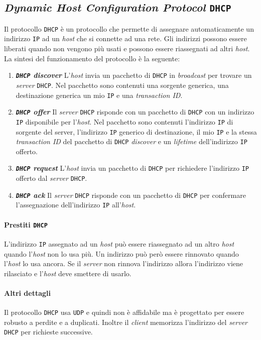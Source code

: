    \subsection{\textit{Dynamic Host Configuration Protocol} \texttt{DHCP}}
        Il protocollo \texttt{DHCP} è un protocollo che permette di assegnare automaticamente un indirizzo \texttt{IP} ad un \textit{host} che si connette ad una rete. Gli indirizzi possono essere liberati quando non vengono più usati e possono essere riassegnati ad altri \textit{host}. La sintesi del funzionamento del protocollo è la seguente: \begin{enumerate}
            \item \textit\textbf{\texttt{DHCP} discover} L'\textit{host} invia un pacchetto di \texttt{DHCP} in \textit{broadcast} per trovare un \textit{server} \texttt{DHCP}. Nel pacchetto sono contenuti una sorgente generica, una destinazione generica un mio \texttt{IP} e una \textit{transaction ID}.
            \item \textit\textbf{\texttt{DHCP} offer} Il \textit{server} \texttt{DHCP} risponde con un pacchetto di \texttt{DHCP} con un indirizzo \texttt{IP} disponibile per l'\textit{host}. Nel pacchetto sono contenuti l'indirizzo \texttt{IP} di sorgente del server, l'indirizzo \texttt{IP} generico di destinazione, il mio \texttt{IP} e la stessa \textit{transaction ID} del pacchetto di \texttt{DHCP} \textit{discover} e un \textit{lifetime} dell'indirizzo \texttt{IP} offerto.
            \item \textit\textbf{\texttt{DHCP} request} L'\textit{host} invia un pacchetto di \texttt{DHCP} per richiedere l'indirizzo \texttt{IP} offerto dal \textit{server} \texttt{DHCP}. 
            \item \textit\textbf{\texttt{DHCP} ack} Il \textit{server} \texttt{DHCP} risponde con un pacchetto di \texttt{DHCP} per confermare l'assegnazione dell'indirizzo \texttt{IP} all'\textit{host}.
        \end{enumerate}
        \paragraph{Prestiti \texttt{DHCP}} L'indirizzo \texttt{IP} assegnato ad un \textit{host} può essere riassegnato ad un altro \textit{host} quando l'\textit{host} non lo usa più. Un indirizzo può però essere rinnovato quando l'\textit{host} lo usa ancora. Se il \textit{server} non rinnova l'indirizzo allora l'indirizzo viene rilasciato e l'\textit{host} deve smettere di usarlo.
        \paragraph{Altri dettagli} Il protocollo \texttt{DHCP} usa \texttt{UDP} e quindi non è affidabile ma è progettato per essere robusto a perdite e a duplicati. Inoltre il \textit{client} memorizza l'indirizzo del \textit{server} \texttt{DHCP} per richieste successive.
